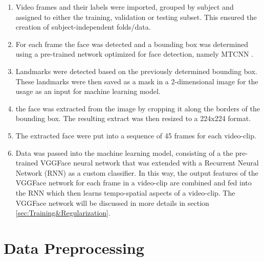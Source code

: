 \begin{enumerate}
    \item Video frames and their labels were imported, grouped by subject and assigned to either the training, validation or testing subset. This ensured the creation of subject-independent folds/data.
    \item For each frame the face was detected and a bounding box was determined using a pre-trained network optimized for face detection, namely MTCNN \citep{Zhang:2016:MTCCN}.
    \item Landmarks were detected based on the previously determined bounding box. These landmarks were then saved as a mask in a 2-dimensional image for the usage as an input for machine learning model.
    \item the face was extracted from the image by cropping it along the borders of the bounding box. The resulting extract was then resized to a 224x224 format.
    \item The extracted face were put into a sequence of 45 frames for each video-clip.
    \item Data was passed into the machine learning model, consisting of a the pre-trained VGGFace \citep{Cao:2018:VGGFace2} neural network that was extended with a Recurrent Neural Network (RNN) as a custom classifier. In this way, the output features of the VGGFace network for each frame in a video-clip are combined and fed into the RNN which then learns  tempo-spatial aspects of a video-clip. The VGGFace network will be discussed in more details in section \ref{sec:Training&Regularization}.
\end{enumerate}


\section{Data Preprocessing}

